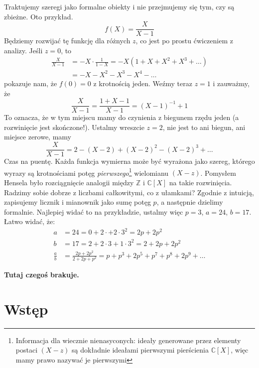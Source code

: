 \documentclass[a4paper,fleqn]{article}
\begin{document}
\begin{multicols}{2}
Traktujemy szeregi jako formalne obiekty i nie przejmujemy się tym, czy są zbieżne. Oto przykład.
\[f(X) = \frac{X}{X-1}\]
Będziemy rozwijać tę funkcję dla różnych $z$, co jest po prostu ćwiczeniem z analizy. Jeśli $z=0$, to 
\begin{align*}
\frac{X}{X-1} & = -X \cdot \frac{1}{1-X} = -X (1+X+X^2+X^3+\dots) \\
& = -X -X^2-X^3-X^4-\dots
\end{align*}
pokazuje nam, że $f(0) = 0$ z krotnością jeden. Weźmy teraz $z=1$ i zauważmy, że \[\frac{X}{X-1} = \frac{1+X-1}{X-1} = (X-1)^{-1}+ 1\]
To oznacza, że w tym miejscu mamy do czynienia z biegunem rzędu jeden (a  rozwinięcie jest skończone!). Ustalmy wreszcie $z=2$, nie jest to ani biegun, ani miejsce zerowe, mamy \[\frac{X}{X-1} = 2 - (X-2) + (X-2)^2-(X-2)^3+\dots\]
Czas na puentę. Każda funkcja wymierna może być wyrażona jako szereg, którego wyrazy są krotnościami potęg \emph{pierwszego}\footnote{Informacja dla wiecznie nienasyconych: ideały generowane przez elementy postaci $(X-z)$ są dokładnie ideałami pierwszymi pierścienia $\mathbb C[X]$, więc mamy prawo nazywać je pierwszymi} wielomianu $(X-z)$. Pomysłem Hensela było rozciągnięcie analogii między $\mathbb Z$ i $\mathbb C[X]$ na takie rozwinięcia. Radzimy sobie dobrze z liczbami całkowitymi, co z ułamkami? Zgodnie z intuicją, zapisujemy licznik i mianownik jako sumę potęg $p$, a następnie dzielimy formalnie. Najlepiej widać to na przykładzie, ustalmy więc $p=3$, $a=24$, $b=17$. Łatwo widać, że:
\begin{align*}
a & = 24= 0+2\cdot+2\cdot 3^2 = 2p+2p^2\\
b & = 17 = 2 + 2 \cdot 3 + 1 \cdot 3^2 = 2+2p+2p^2 \\
\frac{a}{b} & = \frac{2p+2p^2}{2+2p+p^2} = p+p^3+2p^5+p^7+p^8+2p^9+\dots
\end{align*}



\textbf{Tutaj czegoś brakuje.}

\section{Wstęp}


\end{multicols}
\end{document}
